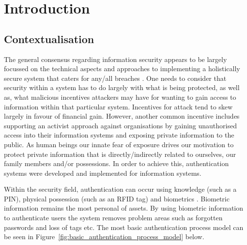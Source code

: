 
\chapter{Introduction}  %

\ifpdf
    \graphicspath{{Chapter1/Figs/Raster/}{Chapter1/Figs/PDF/}{Chapter1/Figs/}}
\else
    \graphicspath{{Chapter1/Figs/Vector/}{Chapter1/Figs/}}
\fi


\section{Contextualisation} %

The general consensus regarding information security appears to be largely focussed on the technical aspects and approaches to implementing a holistically secure system that caters for any/all breaches \citep{Anderson2001}. One needs to consider that security within a system has to do largely with what is being protected, as well as, what malicious incentives attackers may have for wanting to gain access to information within that particular system. Incentives for attack tend to skew largely in favour of financial gain. However, another common incentive includes supporting an activist approach against organisations by gaining unauthorised access into their information systems and exposing private information to the public. As human beings our innate fear of exposure drives our motivation to protect private information that is directly/indirectly related to ourselves, our family members and/or possessions. In order to achieve this, authentication systems were developed and implemented for information systems. 

Within the security field, authentication can occur using knowledge (such as a PIN), physical possession (such as an RFID tag) and biometrics \citep{Liu2001}. Biometric information remains the most personal of assets. By using biometric information to authenticate users the system removes problem areas such as forgotten passwords and loss of tags etc. The most basic authentication process model can be seen in Figure~\ref{fig:basic_authentication_process_model} below.



